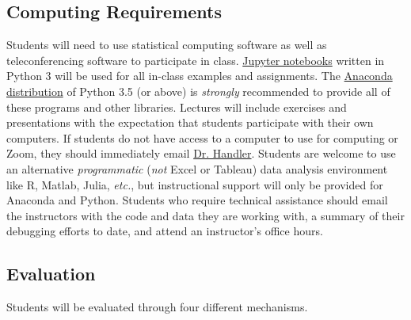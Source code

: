 \documentclass[10pt]{memoir}
\makeatletter
\def\instructorAlastname{Handler}
\def\instructorAemail{abe.handler@colorado.edu}
\makeatother
\begin{document}
\subsection{Computing Requirements}
Students will need to use statistical computing software as well as teleconferencing software to participate in class. \href{http://jupyter.org/}{Jupyter notebooks} written in Python 3 will be used for all in-class examples and assignments. The \href{https://www.continuum.io/why-anaconda}{Anaconda distribution} of Python 3.5 (or above) is \textit{strongly} recommended to provide all of these programs and other libraries. Lectures will include exercises and presentations with the expectation that students participate with their own computers. If students do not have access to a computer to use for computing or Zoom, they should immediately email \href{mailto:\instructorAemail}{Dr. \instructorAlastname}. Students are welcome to use an alternative \textit{programmatic} (\textit{not} Excel or Tableau) data analysis environment like R, Matlab, Julia, \textit{etc.}, but instructional support will only be provided for Anaconda and Python. Students who require technical assistance should email the instructors with the code and data they are working with, a summary of their debugging efforts to date, and attend an instructor's office hours.

\subsection{Evaluation} 
Students will be evaluated through four different mechanisms. 
\end{document}
